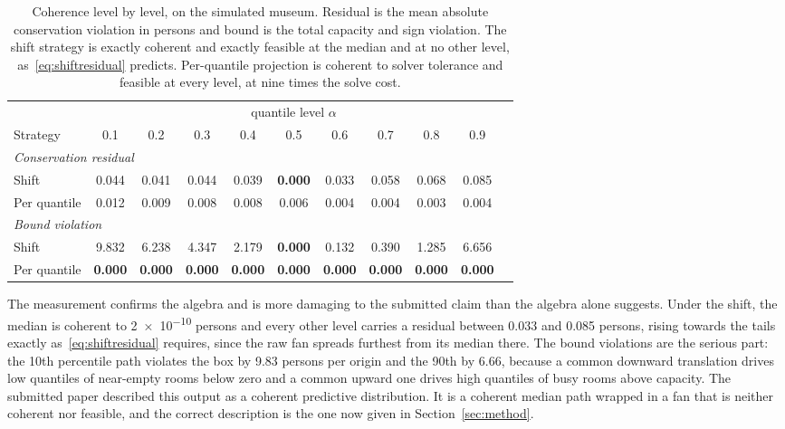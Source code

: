 \documentclass[11pt]{article}
\theoremstyle{plain}
\theoremstyle{definition}
\theoremstyle{remark}
\newcommand{\best}[1]{\textbf{#1}}
\newif\ifrevisionmarkup
\newcommand{\new}[1]{\ifrevisionmarkup\textcolor{revision}{#1}\else#1\fi}
\begin{document}
\new{\begin{table}[htbp]
\centering
\caption{\new{Coherence level by level, on the simulated museum. Residual is the mean absolute conservation violation in persons and bound is the total capacity and sign violation. The shift strategy is exactly coherent and exactly feasible at the median and at no other level, as~\eqref{eq:shiftresidual} predicts. Per-quantile projection is coherent to solver tolerance and feasible at every level, at nine times the solve cost.}}
\label{tab:quantcoh}
\small
\begin{tabular}{lcccccccccc}
\toprule
& \multicolumn{9}{c}{quantile level $\alpha$} \\
\cmidrule(lr){2-10}
Strategy & 0.1 & 0.2 & 0.3 & 0.4 & 0.5 & 0.6 & 0.7 & 0.8 & 0.9 \\
\midrule
\multicolumn{10}{l}{\emph{Conservation residual}}\\
Shift        & 0.044 & 0.041 & 0.044 & 0.039 & \best{0.000} & 0.033 & 0.058 & 0.068 & 0.085 \\
Per quantile & 0.012 & 0.009 & 0.008 & 0.008 & 0.006 & 0.004 & 0.004 & 0.003 & 0.004 \\
\midrule
\multicolumn{10}{l}{\emph{Bound violation}}\\
Shift        & 9.832 & 6.238 & 4.347 & 2.179 & \best{0.000} & 0.132 & 0.390 & 1.285 & 6.656 \\
Per quantile & \best{0.000} & \best{0.000} & \best{0.000} & \best{0.000} & \best{0.000} & \best{0.000} & \best{0.000} & \best{0.000} & \best{0.000} \\
\bottomrule
\end{tabular}
\end{table}}

\new{The measurement confirms the algebra and is more damaging to the submitted claim than the algebra alone suggests. Under the shift, the median is coherent to \num{2e-10} persons and every other level carries a residual between \num{0.033} and \num{0.085} persons, rising towards the tails exactly as~\eqref{eq:shiftresidual} requires, since the raw fan spreads furthest from its median there. The bound violations are the serious part: the \num{10}th percentile path violates the box by \num{9.83} persons per origin and the \num{90}th by \num{6.66}, because a common downward translation drives low quantiles of near-empty rooms below zero and a common upward one drives high quantiles of busy rooms above capacity. The submitted paper described this output as a coherent predictive distribution. It is a coherent median path wrapped in a fan that is neither coherent nor feasible, and the correct description is the one now given in Section~\ref{sec:method}.}
\end{document}
